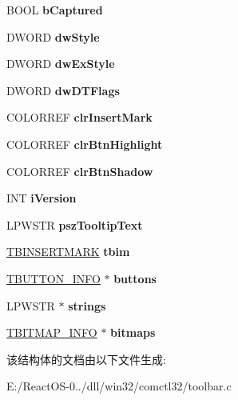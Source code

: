 \begin{DoxyCompactItemize}
B\+O\+OL {\bfseries b\+Captured}
\item 
\mbox{\label{struct_t_o_o_l_b_a_r___i_n_f_o_a57ef4c10fe66ce39dc082bf0ede9abc0}} 
D\+W\+O\+RD {\bfseries dw\+Style}
\item 
\mbox{\label{struct_t_o_o_l_b_a_r___i_n_f_o_a0b9ca666299776dc5c20ce4691cc4bb2}} 
D\+W\+O\+RD {\bfseries dw\+Ex\+Style}
\item 
\mbox{\label{struct_t_o_o_l_b_a_r___i_n_f_o_a41c50380ffdd12d57d56967ce7ec2fde}} 
D\+W\+O\+RD {\bfseries dw\+D\+T\+Flags}
\item 
\mbox{\label{struct_t_o_o_l_b_a_r___i_n_f_o_a5016e142ac4b4bd5294daa62343179b4}} 
C\+O\+L\+O\+R\+R\+EF {\bfseries clr\+Insert\+Mark}
\item 
\mbox{\label{struct_t_o_o_l_b_a_r___i_n_f_o_aef3cdf939b5083e8fa9cf86b872b0fb0}} 
C\+O\+L\+O\+R\+R\+EF {\bfseries clr\+Btn\+Highlight}
\item 
\mbox{\label{struct_t_o_o_l_b_a_r___i_n_f_o_a5ee198a1a4fcabf9803874fc80430f2e}} 
C\+O\+L\+O\+R\+R\+EF {\bfseries clr\+Btn\+Shadow}
\item 
\mbox{\label{struct_t_o_o_l_b_a_r___i_n_f_o_a4693d5c71c75cd0228e07c3dc14641ac}} 
I\+NT {\bfseries i\+Version}
\item 
\mbox{\label{struct_t_o_o_l_b_a_r___i_n_f_o_abb2173afd292d74dfdfa7ad7cd81a461}} 
L\+P\+W\+S\+TR {\bfseries psz\+Tooltip\+Text}
\item 
\mbox{\label{struct_t_o_o_l_b_a_r___i_n_f_o_a78af531e64071f5e7beeb62ae71480c3}} 
\hyperlink{struct_t_b_i_n_s_e_r_t_m_a_r_k}{T\+B\+I\+N\+S\+E\+R\+T\+M\+A\+RK} {\bfseries tbim}
\item 
\mbox{\label{struct_t_o_o_l_b_a_r___i_n_f_o_a715bdb3706be5fd5fc40467bfa92c33a}} 
\hyperlink{struct_t_b_u_t_t_o_n___i_n_f_o}{T\+B\+U\+T\+T\+O\+N\+\_\+\+I\+N\+FO} $\ast$ {\bfseries buttons}
\item 
\mbox{\label{struct_t_o_o_l_b_a_r___i_n_f_o_ab6f742d29f03ac9c3922284fdb8e70a5}} 
L\+P\+W\+S\+TR $\ast$ {\bfseries strings}
\item 
\mbox{\label{struct_t_o_o_l_b_a_r___i_n_f_o_a2f10910be95910b8f25c7ac2d5f47d5d}} 
\hyperlink{struct_t_b_i_t_m_a_p___i_n_f_o}{T\+B\+I\+T\+M\+A\+P\+\_\+\+I\+N\+FO} $\ast$ {\bfseries bitmaps}
\end{DoxyCompactItemize}


该结构体的文档由以下文件生成\+:\begin{DoxyCompactItemize}
\item 
E\+:/\+React\+O\+S-\/0../dll/win32/comctl32/toolbar.\+c\end{DoxyCompactItemize}
